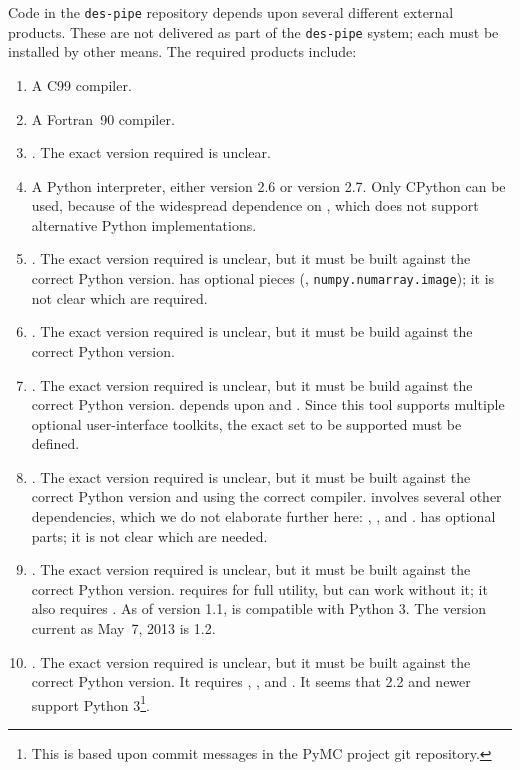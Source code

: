 \documentclass[draftmode,draftwater]{memarticle}
\begin{document}
Code in the \texttt{des-pipe} repository depends upon several different
external products. These are not delivered as part of the
\texttt{des-pipe} system; each must be installed by other means. The
required products include:
\begin{enumerate}
  \item A C99 compiler.
  \item A Fortran~90 compiler.
  \item {}. The exact version required is unclear.
  \item A Python interpreter, either version 2.6 or version 2.7. Only
    CPython can be used, because of the widespread dependence on
    , which does not support alternative Python
    implementations.
  \item {}. The exact version required is unclear, but it must
    be built against the correct Python version.  has
    optional pieces (\eg, \texttt{numpy.numarray.image}); it is not
    clear which are required.
  \item {}. The exact version required is unclear, but it
    must be build against the correct Python version.
  \item {}. The exact version required is unclear, but it
    must be build against the correct Python version. 
    depends upon  and . Since this tool
    supports multiple optional user-interface toolkits, the exact set to
    be supported must be defined.
  \item {}. The exact version required is unclear, but it must
    be built against the correct Python version and using the correct
    \cpp{} compiler.  involves several other dependencies,
    which we do not elaborate further here: ,
    , and .  has optional parts; it is
    not clear which are needed.
  \item {}. The exact version required is unclear, but it must
    be built against the correct Python version.  requires
     for full utility, but can work without it; it also
    requires . As of version 1.1,  is compatible
    with Python 3. The version current as May~7, 2013 is 1.2.
  \item {}. The exact version required is unclear, but it must
    be built against the correct Python version. It requires
    , , and . It seems that
     2.2 and newer support Python 3\footnote{This is based
      upon commit messages in the PyMC project git repository.}.
\end{enumerate}
\end{document}
